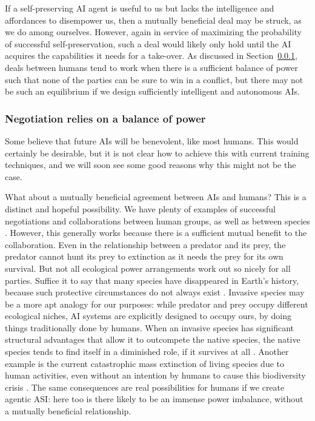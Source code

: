 If a self-preserving AI agent is useful to us but lacks the intelligence and affordances to disempower us, then a mutually beneficial deal may be struck, as we do among ourselves. However, again in service of maximizing the probability of successful self-preservation, such a deal would likely only hold until the AI acquires the capabilities it needs for a take-over. As discussed in Section~\ref{sec:existential:riskseverity:negotiation}, deals between humans tend to work when there is a sufficient balance of power such that none of the parties can be sure to win in a conflict, but there may not be such an equilibrium if we design sufficiently intelligent and autonomous AIs.

    \subsubsection{Negotiation relies on a balance of power}
    \label{sec:existential:riskseverity:negotiation}

Some believe that future AIs will be benevolent, like most humans. This would certainly be desirable, but it is not clear how to achieve this with current training techniques, and we will soon see some good reasons why this might not be the case. 

What about a mutually beneficial agreement between AIs and humans? This is a distinct and hopeful possibility. We have plenty of examples of successful negotiations and collaborations between human groups, as well as between species \cite{global.oup.com.academic.product.mutualism.9780199675654.cc.us.lang.en}. However, this generally works because there is a sufficient mutual benefit to the collaboration. Even in the relationship between a predator and its prey, the predator cannot hunt its prey to extinction as it needs the prey for its own survival. But not all ecological power arrangements work out so nicely for all parties. Suffice it to say that many species have disappeared in Earth's history, because such protective circumstances do not always exist \cite{link.springer.com.book.10.1007.978.1.4757.5202.1}. Invasive species may be a more apt analogy for our purposes: while predator and prey occupy different ecological niches, AI systems are explicitly designed to occupy ours, by doing things traditionally done by humans. When an invasive species has significant structural advantages that allow it to outcompete the native species, the native species tends to find itself in a diminished role, if it survives at all \cite{evolutionary.impact.invasive.species}. Another example is the current catastrophic mass extinction of living species due to human activities, even without an intention by humans to cause this biodiversity crisis \cite{ceballos2015accelerated}. The same consequences are  real possibilities for humans if we create agentic ASI: here too is there likely to be an immense power imbalance, without a mutually beneficial relationship.

